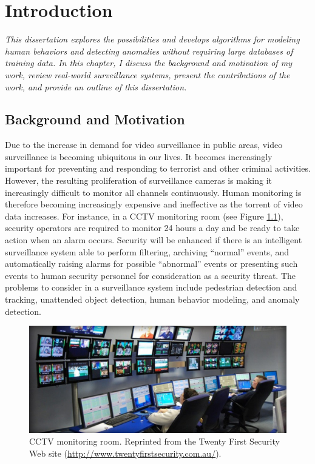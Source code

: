 \setlength{\footskip}{8mm}

\chapter{Introduction} 

\textit{This dissertation explores the possibilities and develops
algorithms for modeling human behaviors and detecting anomalies
without requiring large databases of training data. In this chapter, I
discuss the background and motivation of my work, review real-world
surveillance systems, present the contributions of the work, and
provide an outline of this dissertation.}

\section{Background and Motivation}

Due to the increase in demand for video surveillance in public areas,
video surveillance is becoming ubiquitous in our lives. It becomes
increasingly important for preventing and responding to terrorist and
other criminal activities. However, the resulting proliferation of
surveillance cameras is making it increasingly difficult to monitor
all channels continuously. Human monitoring is therefore becoming
increasingly expensive and ineffective as the torrent of video data
increases. For instance, in a CCTV monitoring room (see
Figure \ref{fig:monitoring}), security operators are required to
monitor 24 hours a day and be ready to take action when an alarm
occurs. Security will be enhanced if there is an intelligent
surveillance system able to perform filtering, archiving ``normal''
events, and automatically raising alarms for possible ``abnormal''
events or presenting such events to human security personnel for
consideration as a security threat. The problems to consider in a
surveillance system include pedestrian detection and tracking,
unattended object detection, human behavior modeling, and anomaly
detection.

\begin{figure}[t]
    \centering
    \includegraphics[width=5in]{figures/monitoring}
    \caption[CCTV monitoring room.]{\small CCTV monitoring
        room. Reprinted from the Twenty First Security Web site
        (\url{http://www.twentyfirstsecurity.com.au/}).}
    \label{fig:monitoring}
\end{figure}


